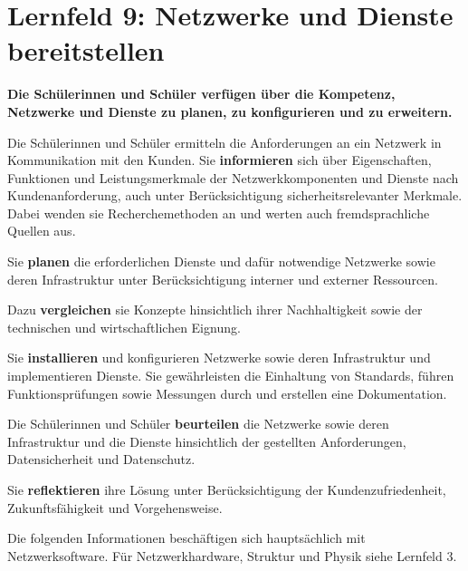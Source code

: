 \chapter{Lernfeld 9: Netzwerke und Dienste bereitstellen}

\textbf{Die Schülerinnen und Schüler verfügen über die Kompetenz, Netzwerke und Dienste
    zu planen, zu konfigurieren und zu erweitern.}

Die Schülerinnen und Schüler ermitteln die Anforderungen an ein Netzwerk in Kommunikation mit den Kunden. Sie \textbf{informieren} sich über Eigenschaften, Funktionen und Leistungsmerkmale der Netzwerkkomponenten und Dienste nach Kundenanforderung, auch unter
Berücksichtigung sicherheitsrelevanter Merkmale. Dabei wenden sie Recherchemethoden
an und werten auch fremdsprachliche Quellen aus.

Sie \textbf{planen} die erforderlichen Dienste und dafür notwendige Netzwerke sowie deren Infrastruktur unter Berücksichtigung interner und externer Ressourcen.

Dazu \textbf{vergleichen} sie Konzepte hinsichtlich ihrer Nachhaltigkeit sowie der technischen und
wirtschaftlichen Eignung.

Sie \textbf{installieren} und konfigurieren Netzwerke sowie deren Infrastruktur und implementieren
Dienste. Sie gewährleisten die Einhaltung von Standards, führen Funktionsprüfungen sowie
Messungen durch und erstellen eine Dokumentation.

Die Schülerinnen und Schüler \textbf{beurteilen} die Netzwerke sowie deren Infrastruktur und die
Dienste hinsichtlich der gestellten Anforderungen, Datensicherheit und Datenschutz.

Sie \textbf{reflektieren} ihre Lösung unter Berücksichtigung der Kundenzufriedenheit, Zukunftsfähigkeit und Vorgehensweise.

Die folgenden Informationen beschäftigen sich hauptsächlich mit Netzwerksoftware. Für Netzwerkhardware, Struktur und Physik siehe Lernfeld 3.







